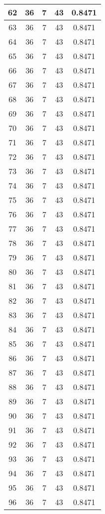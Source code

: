 \documentclass[letterpaper, 12pt]{article}
\begin{document}
\begin{longtable}{|c|c|c|c|c|}
\hline
62 & 36 & 7 & 43 & 0.8471 \\
\hline
63 & 36 & 7 & 43 & 0.8471 \\
\hline
64 & 36 & 7 & 43 & 0.8471 \\
\hline
65 & 36 & 7 & 43 & 0.8471 \\
\hline
66 & 36 & 7 & 43 & 0.8471 \\
\hline
67 & 36 & 7 & 43 & 0.8471 \\
\hline
68 & 36 & 7 & 43 & 0.8471 \\
\hline
69 & 36 & 7 & 43 & 0.8471 \\
\hline
70 & 36 & 7 & 43 & 0.8471 \\
\hline
71 & 36 & 7 & 43 & 0.8471 \\
\hline
72 & 36 & 7 & 43 & 0.8471 \\
\hline
73 & 36 & 7 & 43 & 0.8471 \\
\hline
74 & 36 & 7 & 43 & 0.8471 \\
\hline
75 & 36 & 7 & 43 & 0.8471 \\
\hline
76 & 36 & 7 & 43 & 0.8471 \\
\hline
77 & 36 & 7 & 43 & 0.8471 \\
\hline
78 & 36 & 7 & 43 & 0.8471 \\
\hline
79 & 36 & 7 & 43 & 0.8471 \\
\hline
80 & 36 & 7 & 43 & 0.8471 \\
\hline
81 & 36 & 7 & 43 & 0.8471 \\
\hline
82 & 36 & 7 & 43 & 0.8471 \\
\hline
83 & 36 & 7 & 43 & 0.8471 \\
\hline
84 & 36 & 7 & 43 & 0.8471 \\
\hline
85 & 36 & 7 & 43 & 0.8471 \\
\hline
86 & 36 & 7 & 43 & 0.8471 \\
\hline
87 & 36 & 7 & 43 & 0.8471 \\
\hline
88 & 36 & 7 & 43 & 0.8471 \\
\hline
89 & 36 & 7 & 43 & 0.8471 \\
\hline
90 & 36 & 7 & 43 & 0.8471 \\
\hline
91 & 36 & 7 & 43 & 0.8471 \\
\hline
92 & 36 & 7 & 43 & 0.8471 \\
\hline
93 & 36 & 7 & 43 & 0.8471 \\
\hline
94 & 36 & 7 & 43 & 0.8471 \\
\hline
95 & 36 & 7 & 43 & 0.8471 \\
\hline
96 & 36 & 7 & 43 & 0.8471 \\

\end{longtable}
\end{document}
